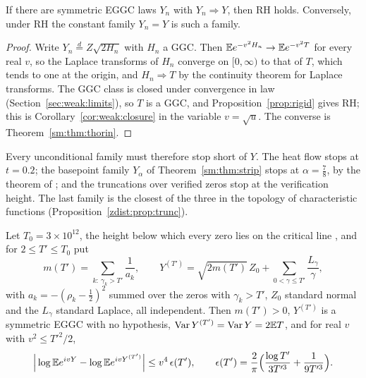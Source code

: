 \begin{proposition}\label{zdist:prop:closure}
If there are symmetric EGGC laws $Y_n$ with $Y_n\Rightarrow Y$, then RH holds. Conversely, under RH the constant family $Y_n=Y$ is such a family.
\end{proposition}

\begin{proof}
Write $Y_n\stackrel d=Z\sqrt{2H_n}$ with $H_n$ a GGC. Then $\mathbb{E} e^{-v^2H_n}\to\mathbb{E} e^{-v^2T}$ for every real $v$, so the Laplace transforms of $H_n$ converge on $[0,\infty)$ to that of $T$, which tends to one at the origin, and $H_n\Rightarrow T$ by the continuity theorem for Laplace transforms. The GGC class is closed under convergence in law (Section~\ref{sec:weak:limits}), so $T$ is a GGC, and Proposition~\ref{prop:rigid} gives RH; this is Corollary~\ref{cor:weak:closure} in the variable $v=\sqrt u$. The converse is Theorem~\ref{sm:thm:thorin}.
\end{proof}

Every unconditional family must therefore stop short of $Y$. The heat flow stops at $t=0.2$; the basepoint family $Y_\alpha$ of Theorem~\ref{sm:thm:strip} stops at $\alpha=\frac78$, by the theorem of \cite{OAI26a}; and the truncations over verified zeros stop at the verification height. The last family is the closest of the three in the topology of characteristic functions (Proposition~\ref{zdist:prop:trunc}).

\begin{proposition}\label{zdist:prop:trunc}
Let $T_0=3\times10^{12}$, the height below which every zero lies on the critical line \cite{PT21}, and for $2\le T'\le T_0$ put
\[
m(T')=\sum_{k:\ \gamma_k>T'}\frac1{a_k},\qquad Y^{(T')}=\sqrt{2m(T')}\,Z_0+\sum_{0<\gamma\le T'}\frac{L_\gamma}{\gamma},
\]
with $a_k=-(\rho_k-\frac12)^2$ summed over the zeros with $\gamma_k>T'$, $Z_0$ standard normal and the $L_\gamma$ standard Laplace, all independent. Then $m(T')>0$, $Y^{(T')}$ is a symmetric EGGC with no hypothesis, $\operatorname{Var}Y^{(T')}=\operatorname{Var}Y=2\mathbb{E} T$, and for real $v$ with $v^2\le T'^2/2$,
\[
\Big|\log\mathbb{E} e^{ivY}-\log\mathbb{E} e^{ivY^{(T')}}\Big|\le v^4\,\epsilon(T'),\qquad \epsilon(T')=\frac2\pi\Big(\frac{\log T'}{3T'^3}+\frac1{9T'^3}\Big).
\]
\end{proposition}

